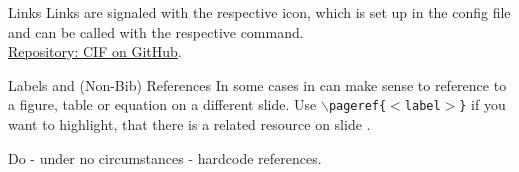 \documentclass[handout]{beamer}
\begin{document}
\begin{frame}{Links}
		Links are signaled with the respective icon, which is set up in the config file and can be called with the respective command.\\
		
		\link \href{https://github.com/cifunibas}{Repository: CIF on GitHub}.
		
\end{frame}


\begin{frame}{Labels and (Non-Bib) References}
	In some cases in can make sense to reference to a figure, table or equation on a different slide. Use \texttt{$\backslash$pageref\{$<$label$>$\}} if you want to highlight, that there is a related resource on slide \pageref{fig:logo}.\\ \vspace{1em}
	
	Do - under no circumstances - hardcode references.	
\end{frame}
\end{document}
